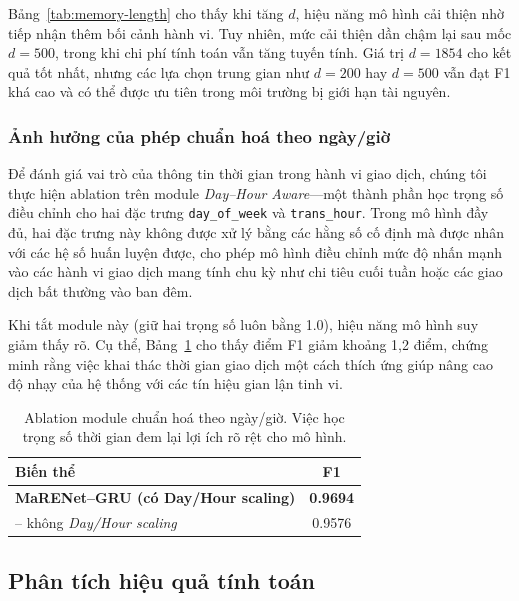 Bảng~\ref{tab:memory-length} cho thấy khi tăng \(d\), hiệu năng mô hình cải thiện nhờ tiếp nhận thêm bối cảnh hành vi. Tuy nhiên, mức cải thiện dần chậm lại sau mốc \(d = 500\), trong khi chi phí tính toán vẫn tăng tuyến tính.  
Giá trị \(d = 1854\) cho kết quả tốt nhất, nhưng các lựa chọn trung gian như \(d = 200\) hay \(d = 500\) vẫn đạt F1 khá cao và có thể được ưu tiên trong môi trường bị giới hạn tài nguyên.

\subsubsection{Ảnh hưởng của phép chuẩn hoá theo ngày/giờ}

Để đánh giá vai trò của thông tin thời gian trong hành vi giao dịch, chúng tôi thực hiện ablation trên module \emph{Day–Hour Aware}—một thành phần học trọng số điều chỉnh cho hai đặc trưng \texttt{day\_of\_week} và \texttt{trans\_hour}. Trong mô hình đầy đủ, hai đặc trưng này không được xử lý bằng các hằng số cố định mà được nhân với các hệ số huấn luyện được, cho phép mô hình điều chỉnh mức độ nhấn mạnh vào các hành vi giao dịch mang tính chu kỳ như chi tiêu cuối tuần hoặc các giao dịch bất thường vào ban đêm.

Khi tắt module này (giữ hai trọng số luôn bằng 1.0), hiệu năng mô hình suy giảm thấy rõ. Cụ thể, Bảng~\ref{tab:ablation-dayhour} cho thấy điểm F1 giảm khoảng 1{,}2 điểm, chứng minh rằng việc khai thác thời gian giao dịch một cách thích ứng giúp nâng cao độ nhạy của hệ thống với các tín hiệu gian lận tinh vi.

\begin{table}[H]
\centering
\small
\begin{tabular}{lc}
\hline
\textbf{Biến thể} & \textbf{F1} \\
\hline
\textbf{MaRENet–GRU (có Day/Hour scaling)} & \textbf{0.9694} \\
– không \emph{Day/Hour scaling} & 0.9576 \\
\hline
\end{tabular}
\caption{Ablation module chuẩn hoá theo ngày/giờ. Việc học trọng số thời gian đem lại lợi ích rõ rệt cho mô hình.}
\label{tab:ablation-dayhour}
\end{table}

\subsection{Phân tích hiệu quả tính toán}
\label{subsec:efficiency}

